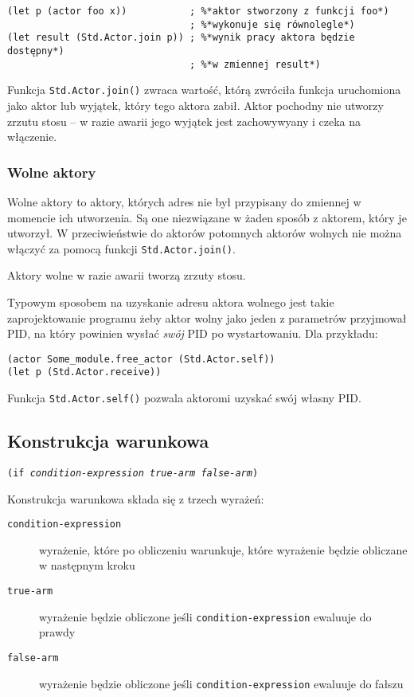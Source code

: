 \begin{lstlisting}
(let p (actor foo x))           ; %*aktor stworzony z funkcji foo*)
                                ; %*wykonuje się równolegle*)
(let result (Std.Actor.join p)) ; %*wynik pracy aktora będzie dostępny*)
                                ; %*w zmiennej result*)
\end{lstlisting}

Funkcja \texttt{Std.Actor.join()} zwraca wartość, którą zwróciła funkcja uruchomiona jako aktor lub wyjątek,
który tego aktora zabił. Aktor pochodny nie utworzy zrzutu stosu -- w razie awarii jego wyjątek jest
zachowywyany i czeka na włączenie.

\subsubsection{Wolne aktory}

Wolne aktory to aktory, których adres nie był przypisany do zmiennej w momencie ich utworzenia. Są one
niezwiązane w żaden sposób z aktorem, który je utworzył. W przeciwieństwie do aktorów potomnych aktorów
wolnych nie można włączyć za pomocą funkcji \texttt{Std.Actor.join()}.

Aktory wolne w razie awarii tworzą zrzuty stosu.

Typowym sposobem na uzyskanie adresu aktora wolnego jest takie zaprojektowanie programu żeby aktor wolny jako
jeden z parametrów przyjmował PID, na który powinien wysłać \emph{swój} PID po wystartowaniu. Dla przykładu:

\begin{lstlisting}
(actor Some_module.free_actor (Std.Actor.self))
(let p (Std.Actor.receive))
\end{lstlisting}

Funkcja \texttt{Std.Actor.self()} pozwala aktoromi uzyskać swój własny PID.

\subsection{Konstrukcja warunkowa}

\texttt{(if \emph{condition-expression} \emph{true-arm} \emph{false-arm})}
\newline

Konstrukcja warunkowa składa się z trzech wyrażeń:

\begin{description}
    \item[\texttt{condition-expression}] wyrażenie, które po obliczeniu warunkuje, które wyrażenie będzie
        obliczane w następnym kroku
    \item[\texttt{true-arm}] wyrażenie będzie obliczone jeśli \texttt{condition-expression} ewaluuje do prawdy
    \item[\texttt{false-arm}] wyrażenie będzie obliczone jeśli \texttt{condition-expression} ewaluuje do
        fałszu
\end{description}

